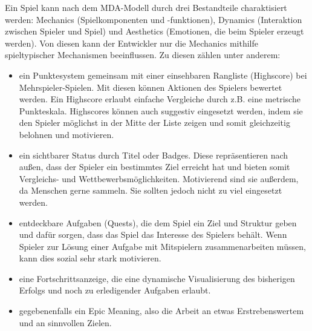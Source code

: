 Ein Spiel kann nach dem MDA-Modell durch drei Bestandteile charaktisiert werden: Mechanics (Spielkomponenten und -funktionen), Dynamics (Interaktion zwischen Spieler und Spiel) und Aesthetics (Emotionen, die beim Spieler erzeugt werden).\cite{Src:GamifDesign} Von diesen kann der Entwickler nur die Mechanics mithilfe spieltypischer Mechanismen beeinflussen. Zu diesen zählen unter anderem:
\begin{itemize}
\item ein Punktesystem gemeinsam mit einer einsehbaren Rangliste (Highscore) bei Mehrspieler-Spielen. Mit diesen können Aktionen des Spielers bewertet werden. Ein Highscore erlaubt einfache Vergleiche durch z.B. eine metrische Punkteskala.\cite{Src:GamifKochOtt} Highscores können auch suggestiv eingesetzt werden, indem sie den Spieler möglichst in der Mitte der Liste zeigen und somit gleichzeitig belohnen und motivieren.\cite{Src:GamifDesign}
\item ein sichtbarer Status durch Titel oder Badges. Diese repräsentieren nach außen, dass der Spieler ein bestimmtes Ziel erreicht hat und bieten somit Vergleichs- und Wettbewerbsmöglichkeiten.\cite{Src:GamifKochOtt} Motivierend sind sie außerdem, da Menschen gerne sammeln. Sie sollten jedoch nicht zu viel eingesetzt werden.\cite{Src:GamifDesign}
\item entdeckbare Aufgaben (Quests), die dem Spiel ein Ziel und Struktur geben und dafür sorgen, dass das  Spiel das Interesse des Spielers behält. Wenn Spieler zur Lösung einer Aufgabe mit Mitspielern zusammenarbeiten müssen, kann dies sozial sehr stark motivieren.\cite{Src:GamifDesign}
\item eine Fortschrittsanzeige, die eine dynamische Visualisierung des bisherigen Erfolgs und noch zu erledigender Aufgaben erlaubt.\cite{Src:GamifKochOtt}
\item gegebenenfalls ein Epic Meaning, also die Arbeit an etwas Erstrebenswertem und an sinnvollen Zielen.\cite{Src:GamifKochOtt}
\end{itemize}
